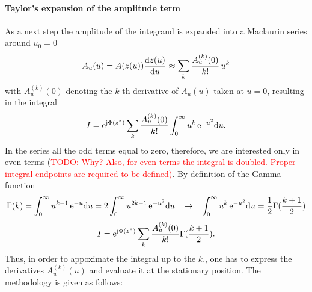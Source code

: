 \documentclass[11pt]{article}
\begin{document}
\paragraph{Taylor's expansion of the amplitude term}
As a next step the amplitude of the integrand is expanded into a Maclaurin series around $u_0 = 0$
\begin{equation}
    A_u(u) = A(z(u))\frac{\mathrm{d} z(u)}{\mathrm{d} u} \approx \sum_{k} \frac{A_u^{(k)}(0)}{k!} \, u^k
    \label{eq:ATaylor}
\end{equation}
with $A^{(k)}_u(0)$ denoting the $k$-th derivative of $A_u(u)$ taken at $u=0$, resulting in the integral 
\begin{equation}
    I = \mathrm{e}^{ \mathrm{j} \Phi(z^*) } \sum_{k} \frac{A_u^{(k)}(0)}{k!} \int_{0}^{\infty}  u^k \, \mathrm{e}^{ -u^2 }  \mathrm{d} u.
\end{equation}
In the series all the odd terms equal to zero, therefore, we are interested only in even terms (\textcolor{red}{TODO: Why? Also, for even terms the integral is doubled. Proper integral endpoints are required to be defined)}.
By definition of the Gamma function
\begin{equation}
    \small
    \Gamma(k) = \int_{0}^{\infty}  u^{k-1} \, \mathrm{e}^{ -u }  \mathrm{d} u  = 
    2\int_{0}^{\infty}  u^{2k-1} \, \mathrm{e}^{ -u^2 }  \mathrm{d} u 
    \hspace{3mm} \rightarrow \hspace{3mm}
    \int_{0}^{\infty}  u^k \, \mathrm{e}^{ -u^2 }  \mathrm{d} u= \frac{1}{2}\Gamma(\frac{k+1}{2}) 
\end{equation}
\begin{equation}
    I = \mathrm{e}^{ \mathrm{j} \Phi(z^*) } \sum_{k} \frac{A_u^{(k)}(0)}{k!} \Gamma(\frac{k+1}{2}).
\end{equation}
Thus, in order to appoximate the integral up to the $k.$, one has to express the derivatives $A_u^{(k)}(u)$ and evaluate it at the stationary position.
The methodology is given as follows:
\end{document}
